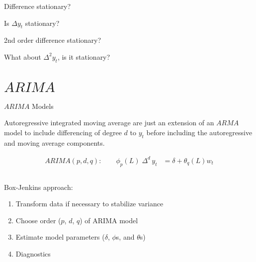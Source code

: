 \documentclass[11pt,ignorenonframetext,]{beamer}
\begin{document}
\begin{frame}[t]{Difference stationary?}
\protect\hypertarget{difference-stationary-1}{}

Is \(\Delta y_t\) stationary?

\end{frame}

\begin{frame}[t]{2nd order difference stationary?}
\protect\hypertarget{nd-order-difference-stationary}{}

What about \(\Delta^2 y_t\), is it stationary?

\end{frame}

\hypertarget{arima}{%
\section{\texorpdfstring{\(ARIMA\)}{ARIMA}}\label{arima}}

\begin{frame}{\(ARIMA\) Models}
\protect\hypertarget{arima-models}{}

Autoregressive integrated moving average are just an extension of an
\(ARMA\) model to include differencing of degree \(d\) to \(y_t\) before
including the autoregressive and moving average components.

\[
\begin{aligned}
ARIMA(p,d,q): \qquad \phi_p(L) \; \Delta^d \, y_t &= \delta + \theta_q(L) w_t  
\end{aligned}
\]

\pause

\(~\)

Box-Jenkins approach:

\begin{enumerate}
\item
  Transform data if necessary to stabilize variance
\item
  Choose order (\(p\), \(d\), \(q\)) of ARIMA model
\item
  Estimate model parameters (\(\delta\), \(\phi\)s, and \(\theta\)s)
\item
  Diagnostics
\end{enumerate}

\end{frame}
\end{document}
